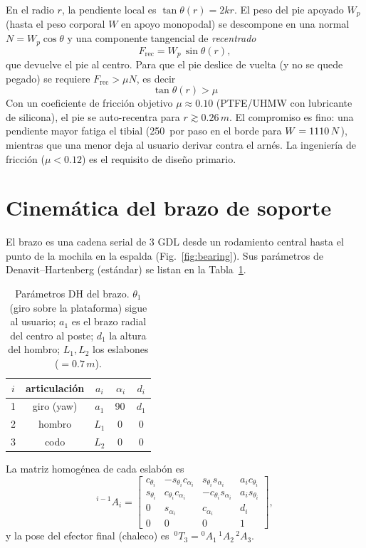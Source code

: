 \documentclass[10pt,twocolumn]{article}
\providecommand{\SI}[2]{#1\,#2}
\providecommand{\meter}{m}\providecommand{\milli}{m}\providecommand{\kilo}{k}
\begin{document}
En el radio $r$, la pendiente local es $\tan\theta(r)=2kr$. El peso del pie apoyado
$W_p$ (hasta el peso corporal $W$ en apoyo monopodal) se descompone en una normal
$N=W_p\cos\theta$ y una componente tangencial de \emph{recentrado}
\begin{equation}
F_{\text{rec}} = W_p\,\sin\theta(r),
\end{equation}
que devuelve el pie al centro. Para que el pie deslice de vuelta (y no se quede pegado)
se requiere $F_{\text{rec}}>\mu N$, es decir
\begin{equation}
\boxed{\ \tan\theta(r) > \mu\ }
\end{equation}
Con un coeficiente de fricci\'on objetivo $\mu\approx0.10$ (PTFE/UHMW con lubricante de
silicona), el pie se auto-recentra para $r\gtrsim\SI{0.26}{\meter}$. El compromiso es
fino: una pendiente mayor fatiga el tibial (\SI{250}{\newton} por paso en el borde para
$W=\SI{1110}{\newton}$), mientras que una menor deja al usuario derivar contra el arn\'es.
La ingenier\'ia de fricci\'on ($\mu<0.12$) es el requisito de dise\~no primario.

\section{Cinem\'atica del brazo de soporte}
El brazo es una cadena serial de 3 GDL desde un rodamiento central hasta el punto de la
mochila en la espalda (Fig.~\ref{fig:bearing}). Sus par\'ametros de
Denavit--Hartenberg (est\'andar) se listan en la Tabla~\ref{tab:dh}.

\begin{table}[H]
\centering
\begin{tabular}{ccccc}
\toprule
$i$ & articulaci\'on & $a_i$ & $\alpha_i$ & $d_i$ \\
\midrule
1 & giro (yaw) & $a_1$ & \SI{90}{\degree} & $d_1$ \\
2 & hombro     & $L_1$ & \SI{0}{\degree}  & $0$ \\
3 & codo       & $L_2$ & \SI{0}{\degree}  & $0$ \\
\bottomrule
\end{tabular}
\caption{Par\'ametros DH del brazo. $\theta_1$ (giro sobre la plataforma) sigue al usuario;
$a_1$ es el brazo radial del centro al poste; $d_1$ la altura del hombro; $L_1,L_2$ los
eslabones ($=\SI{0.7}{\meter}$).}
\label{tab:dh}
\end{table}

La matriz homog\'enea de cada eslabón es
\begin{equation}
{}^{i-1}\!A_i=
\begin{bmatrix}
c_{\theta_i} & -s_{\theta_i}c_{\alpha_i} & s_{\theta_i}s_{\alpha_i} & a_i c_{\theta_i}\\
s_{\theta_i} &  c_{\theta_i}c_{\alpha_i} & -c_{\theta_i}s_{\alpha_i} & a_i s_{\theta_i}\\
0 & s_{\alpha_i} & c_{\alpha_i} & d_i\\
0&0&0&1
\end{bmatrix},
\end{equation}
y la pose del efector final (chaleco) es
$\,{}^{0}T_3={}^{0}\!A_1\,{}^{1}\!A_2\,{}^{2}\!A_3$.
\end{document}
